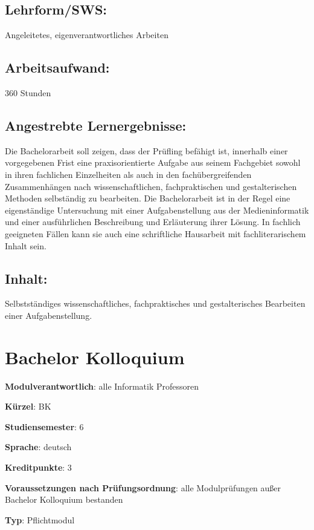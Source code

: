 \section*{Lehrform/SWS:}\label{lehrformsws-3}

Angeleitetes, eigenverantwortliches Arbeiten

\section*{Arbeitsaufwand:}\label{arbeitsaufwand-3}

360 Stunden

\section*{Angestrebte
Lernergebnisse:}\label{angestrebte-lernergebnisse-3}

Die Bachelorarbeit soll zeigen, dass der Prüfling befähigt ist,
innerhalb einer vorgegebenen Frist eine praxisorientierte Aufgabe aus
seinem Fachgebiet sowohl in ihren fachlichen Einzelheiten als auch in
den fachübergreifenden Zusammenhängen nach wissenschaftlichen,
fachpraktischen und gestalterischen Methoden selbständig zu bearbeiten.
Die Bachelorarbeit ist in der Regel eine eigenständige Untersuchung mit
einer Aufgabenstellung aus der Medieninformatik und einer ausführlichen
Beschreibung und Erläuterung ihrer Lösung. In fachlich geeigneten Fällen
kann sie auch eine schriftliche Hausarbeit mit fachliterarischem Inhalt
sein.

\section*{Inhalt:}\label{inhalt-3}

Selbstständiges wissenschaftliches, fachpraktisches und gestalterisches
Bearbeiten einer Aufgabenstellung.

\chapter{Bachelor Kolloquium}\label{bachelor-kolloquium}

\begin{modulHead}
\textbf{Modulverantwortlich}: alle Informatik
Professoren
\end{modulHead}
\begin{modulHead}
\textbf{Kürzel}:
BK
\end{modulHead}
\begin{modulHead}
\textbf{Studiensemester}:
6
\end{modulHead}
\begin{modulHead}
\textbf{Sprache}:
deutsch
\end{modulHead}
\begin{modulHead}
\textbf{Kreditpunkte}:
3
\end{modulHead}
\begin{modulHead}
\textbf{Voraussetzungen nach
Prüfungsordnung}: alle Modulprüfungen außer Bachelor Kolloquium
bestanden
\end{modulHead}
\begin{modulHead}
\textbf{Typ}:
Pflichtmodul
\end{modulHead}



